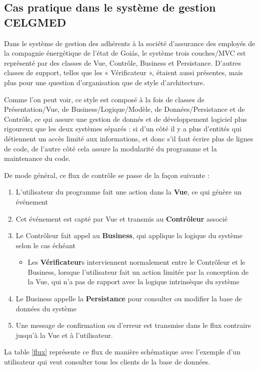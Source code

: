 \subsection{Cas pratique dans le système de gestion CELGMED}

Dans le système de gestion des adhérents à la société d'assurance des employés de la compagnie énergétique de l'état de Goiás, le système trois couches/MVC est représenté par des classes de Vue, Contrôle, Business et Persistance. D'autres classes de support, telles que les  « Vérificateur », étaient aussi présentes, mais plus pour une question d'organisation que de  style d'architecture.

Comme l'on peut voir, ce style est composé à la fois de classes de Présentation/Vue, de Business/Logique/Modèle, de Données/Persistance et de Contrôle, ce qui assure une gestion de donnés et de développement logiciel plus rigoureux que les deux systèmes séparés : si d'un côté il y a plus d'entités qui détiennent un accès limité aux informations, et donc s'il faut écrire plus de lignes de code, de l'autre côté cela assure la modularité du programme et la maintenance du code.

De mode général, ce flux de contrôle se passe de la façon suivante :

\begin{enumerate}
\item L'utilisateur du programme fait une action dans la \textbf{Vue}, ce qui génère un événement
\item Cet événement est capté par Vue et transmis au \textbf{Contrôleur} associé
\item Le Contrôleur fait appel au \textbf{Business}, qui applique la logique du système selon le cas échéant
\begin{itemize}
\item Les \textbf{Vérificateur}s interviennent normalement entre le Contrôleur et le Business, lorsque l'utilisateur fait un action limitée par la conception de la Vue, qui n'a pas de rapport avec la logique intrinsèque du système
\end{itemize}
\item Le Business appelle la \textbf{Persistance} pour consulter ou modifier la base de données du système
\item Une message de confirmation ou d'erreur est transmise dans le flux contraire jusqu'à la Vue et à l'utilisateur.
\end{enumerate}

La table \ref{flux} représente ce flux de manière schématique avec l'exemple d'un utilisateur qui veut consulter tous les clients de la base de données.

